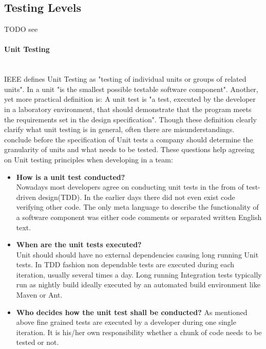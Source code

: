 \documentclass[12pt, notitlepage]{article}
\begin{document}
\subsection{Testing Levels}
TODO see \cite{sw-testing-quality-assurance}
\paragraph{Unit Testing} ~\\
IEEE defines Unit Testing as\cite{unit-testing-definition} "testing of individual units or groups of related units". In \cite{sw-testing-quality-assurance}
a unit "is the smallest possible testable software component". Another, yet more practical definition is\cite{practical-unit-testing-definition}:
A unit test is "a test, executed by the developer in a laboratory environment, that should demonstrate that the program meets the requirements set in the design specification". Though these definition clearly clarify what unit testing is in general, often there are misunderstandings. \cite{unit-testing-survey} conclude
before the specification of Unit tests a company should determine the granularity of units and what needs to be tested.
These questions help agreeing on Unit testing principles when developing in a team:\\
\begin{itemize}
	\item \textbf{How is a unit test conducted?}\\
	Nowadays most developers agree on conducting unit tests in the from of test-driven design(TDD)\cite{beck-tdd}. 
	In the earlier days there did not even exist code verifying other code. The only meta language to describe the functionality of a software component was either
	code comments or separated written English text.
	\item \textbf{When are the unit tests executed?}\\
	Unit should should have no external dependencies causing long running Unit tests. In TDD fashion non dependable tests are executed during each iteration,
	usually several times a day. Long running Integration tests typically run as nightly build ideally executed by an automated build environment like
	Maven\cite{maven} or Ant\cite{ant}.
	\item \textbf{Who decides how the unit test shall be conducted?}
	As mentioned above fine grained tests are executed by a developer during one single iteration. It is his/her own responsibility whether a chunk of code needs to
	be tested or not.
\end{itemize}
\end{document}
